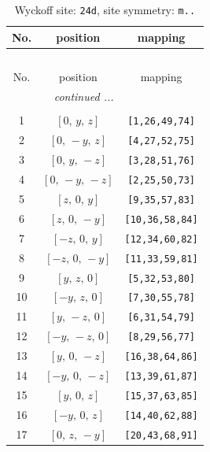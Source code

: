 \documentclass[fleqn,8pt]{jsarticle}
\begin{document}
\begin{longtable}{ccc}
\caption{Wyckoff site: {\tt 24d}, site symmetry: {\tt m..}}
 \\
 \hline \hline
No. & position & mapping \\ \hline \endfirsthead

\multicolumn{2}{l}{\tablename\ \thetable{}} \\
 \hline \hline
No. & position & mapping \\ \hline \endhead

 \hline \hline
\multicolumn{2}{r}{\footnotesize\it continued ...} \\ \endfoot

 \hline \hline
\multicolumn{2}{r}{} \\ \endlastfoot

1 & $\left[ 0,\, y,\, z \right]$ & {\tt [1,26,49,74]} \\ \hline
2 & $\left[ 0,\, - y,\, z \right]$ & {\tt [4,27,52,75]} \\ \hline
3 & $\left[ 0,\, y,\, - z \right]$ & {\tt [3,28,51,76]} \\ \hline
4 & $\left[ 0,\, - y,\, - z \right]$ & {\tt [2,25,50,73]} \\ \hline
5 & $\left[ z,\, 0,\, y \right]$ & {\tt [9,35,57,83]} \\ \hline
6 & $\left[ z,\, 0,\, - y \right]$ & {\tt [10,36,58,84]} \\ \hline
7 & $\left[ - z,\, 0,\, y \right]$ & {\tt [12,34,60,82]} \\ \hline
8 & $\left[ - z,\, 0,\, - y \right]$ & {\tt [11,33,59,81]} \\ \hline
9 & $\left[ y,\, z,\, 0 \right]$ & {\tt [5,32,53,80]} \\ \hline
10 & $\left[ - y,\, z,\, 0 \right]$ & {\tt [7,30,55,78]} \\ \hline
11 & $\left[ y,\, - z,\, 0 \right]$ & {\tt [6,31,54,79]} \\ \hline
12 & $\left[ - y,\, - z,\, 0 \right]$ & {\tt [8,29,56,77]} \\ \hline
13 & $\left[ y,\, 0,\, - z \right]$ & {\tt [16,38,64,86]} \\ \hline
14 & $\left[ - y,\, 0,\, - z \right]$ & {\tt [13,39,61,87]} \\ \hline
15 & $\left[ y,\, 0,\, z \right]$ & {\tt [15,37,63,85]} \\ \hline
16 & $\left[ - y,\, 0,\, z \right]$ & {\tt [14,40,62,88]} \\ \hline
17 & $\left[ 0,\, z,\, - y \right]$ & {\tt [20,43,68,91]} \\ \hline

\end{longtable}
\end{document}
